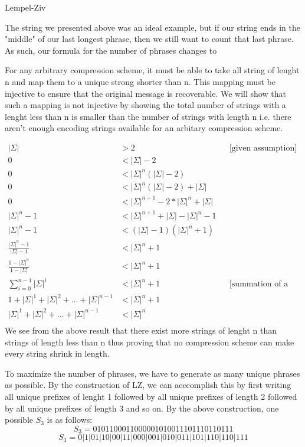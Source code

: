 \documentclass[11pt, nopagenumbers]{adamblan-hw}
\newcommand{\ceil}[1]{\left\lceil #1 \right\rceil}
\begin{document}
\begin{question}{\color{red} Lempel-Ziv}
\begin{part}
The string we presented above was an ideal example, but if our string ends in the "middle" of our last
longest phrase, then we still want to count that last phrase. As such, our formula for the number of phrases changes    
to \fbox{$p = \frac{\ceil{\sqrt{1 + 8n}} - 1}{2}$}
\end{part}

\pagebreak
\begin{part}
For any arbitrary compression scheme, it must be able to take all string of lenght n and map them
to a unique strong shorter than n. This mapping must be injective to ensure that the original message 
is recoverable. We will show that such a mapping is not injective by showing the total number of strings with
a lenght less than n is smaller than the number of strings with length n i.e. there aren't enough encoding strings
available for an arbitary compression scheme.

\begin{align*}
|\Sigma| &> 2 && \text{[given assumption]} \\
0 &< |\Sigma| - 2 \\
0 &< |\Sigma|^n(|\Sigma| - 2) \\
0 &< |\Sigma|^n(|\Sigma| - 2) +|\Sigma| \\
0 &< |\Sigma|^{n + 1} - 2*|\Sigma|^n + |\Sigma| \\
|\Sigma|^n - 1 &< |\Sigma|^{n + 1} + |\Sigma| - |\Sigma|^n - 1 \\
|\Sigma|^n - 1 &< (|\Sigma|- 1)(|\Sigma|^n + 1) \\
\frac{|\Sigma|^n - 1}{|\Sigma|- 1} &< |\Sigma|^n + 1 \\
\frac{1 - |\Sigma|^n}{1 - |\Sigma|} &< |\Sigma|^n + 1 \\
\sum\limits_{i=0}^{n - 1}{|\Sigma|^i} &< |\Sigma|^n + 1  && \text{[summation of a finite geometric series]}\\
1 + |\Sigma|^1 + |\Sigma|^2 + \dots + |\Sigma|^{n - 1} &< |\Sigma|^n + 1 \\
|\Sigma|^1 + |\Sigma|^2 + \dots + |\Sigma|^{n - 1} &< |\Sigma|^n \\
\end{align*}
We see from the above result that there exist more strings of lenght n than strings of length less than n thus proving
that no compression scheme can make every string shrink in length.
\end{part}

\pagebreak
\begin{part}
To maximize the number of phrases, we have to generate as many unique phrases as possible.
By the construction of LZ, we can acccomplish this by first writing all unique prefixes of lenght 1
followed by all unique prefixes of length 2 followed by all unique prefixes of length 3 and so on.
By the above construction, one possible $S_3$ is as follows: 
$$S_3 = 0101100011000001010011101110110111$$
$$S_3 = 0|1|01|10|00|11|000|001|010|011|101|110|110|111$$
\end{part}


\end{question}
\end{document}
